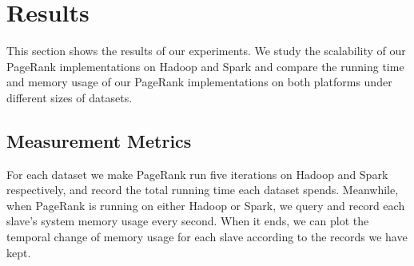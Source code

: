 \documentclass[12pt,conference,letterpaper]{IEEEtran}
\begin{document}




\section{Results}
\label{sec:results}
 This section shows the results of our experiments. We study the scalability of our PageRank implementations on Hadoop and Spark and compare the running time and memory usage of our PageRank implementations on both platforms under different sizes of datasets.


\subsection{Measurement Metrics}
For each dataset we make PageRank run five iterations on Hadoop and Spark respectively, and record the total running time each dataset spends. Meanwhile, when PageRank is running on either Hadoop or Spark, we query and record each slave's system memory usage every second. When it ends, we can plot the temporal change of memory usage for each slave according to the records we have kept.
\end{document}
